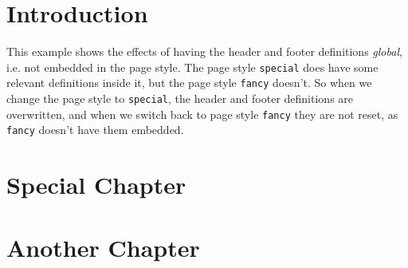 \documentclass[oneside]{report}
\begin{document}
\chapter{Introduction}

This example shows the effects of having the header and footer definitions \emph{global}, i.e. not embedded in the page style. The page style \texttt{special} does have some relevant definitions inside it, but the page style \texttt{fancy} doesn't. So when we change the page style to \texttt{special}, the header and footer definitions are overwritten, and when we switch back to page style \texttt{fancy} they are not reset, as \texttt{fancy} doesn't have them embedded.

\bigskip

\lipsum

\chapter{Special Chapter}
\pagestyle{special}
\lipsum

\chapter{Another Chapter}
\pagestyle{fancy}
\lipsum
\end{document}

